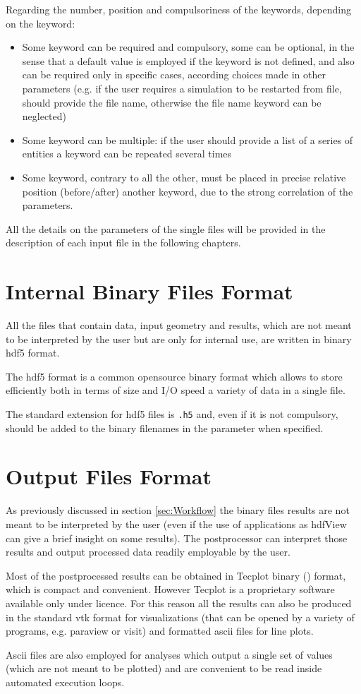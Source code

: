 Regarding the number, position and compulsoriness of the keywords, depending on the keyword:
\begin{itemize}
\item Some keyword can be required and compulsory, some can be optional, in the sense that a default value is employed if the keyword is not defined, and also can be required only in specific cases, according choices made in other parameters (e.g. if the user requires a simulation to be restarted from file, should provide the file name, otherwise the file name keyword can be neglected)
\item Some keyword can be multiple: if the user should provide a list of a series of entities a keyword can be repeated several times
\item Some keyword, contrary to all the other, must be placed in precise relative position (before/after) another keyword, due to the strong correlation of the parameters.
\end{itemize}
All the details on the parameters of the single files will be provided in the description of each input file in the following chapters.

\section{Internal Binary Files Format}
\label{sec:BynaryFilesFormat}
All the files that contain data, input geometry and results, which are not meant to be interpreted by the user but are only for internal use, are written in binary hdf5 format. 

The hdf5 format is a common opensource binary format which allows to store efficiently both in terms of size and I/O speed a variety of data in a single file. 

The standard extension for hdf5 files is \texttt{.h5} and, even if it is not compulsory, should be added to the binary filenames in the parameter when specified.

\section{Output Files Format}
\label{sec:OutputFilesFormat}

As previously discussed in section \ref{sec:Workflow} the binary files results are not meant to be interpreted by the user (even if the use of applications as hdfView can give a brief insight on some results). The postprocessor can interpret those results and output processed data readily employable by the user.

Most of the postprocessed results can be obtained in Tecplot binary (\texttt{}) format, which is compact and convenient. However Tecplot is a proprietary software available only under licence. For this reason all the results can also be produced in the standard vtk format for visualizations (that can be opened by a variety of programs, e.g. paraview or visit) and formatted ascii files for line plots. 

Ascii files are also employed for analyses which output a single set of values (which are not meant to be plotted) and are convenient to be read inside automated execution loops. 